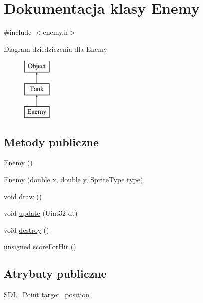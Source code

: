 \hypertarget{class_enemy}{}\section{Dokumentacja klasy Enemy}
\label{class_enemy}


{\ttfamily \#include $<$enemy.\+h$>$}

Diagram dziedziczenia dla Enemy\begin{figure}[H]
\begin{center}
\leavevmode
\includegraphics[height=3.000000cm]{class_enemy}
\end{center}
\end{figure}
\subsection*{Metody publiczne}
\begin{DoxyCompactItemize}
\item 
\hyperlink{class_enemy_a94f30d348b6d2840fd71675472ba38dd}{Enemy} ()
\item 
\hyperlink{class_enemy_a716fd77723d2c3c9a521672245bf89f8}{Enemy} (double x, double y, \hyperlink{type_8h_ac6fa10729dffeb6a192492f13c25e31a}{Sprite\+Type} \hyperlink{class_object_a1b89f32cd9e0040f8a2455f3cef7d0d2}{type})
\item 
void \hyperlink{class_enemy_a7dcf45915f6288ef9264ec60af621b6c}{draw} ()
\item 
void \hyperlink{class_enemy_a03c09cab6c4950e4cae880c15b2fd739}{update} (Uint32 dt)
\item 
void \hyperlink{class_enemy_a296a5757097f271eb01284eabb064715}{destroy} ()
\item 
unsigned \hyperlink{class_enemy_a024794c12555ca3b948aebb576e8915e}{score\+For\+Hit} ()
\end{DoxyCompactItemize}
\subsection*{Atrybuty publiczne}
\begin{DoxyCompactItemize}
\item 
S\+D\+L\+\_\+\+Point \hyperlink{class_enemy_abb410f03f34e4a1ce889ef8441382eb0}{target\+\_\+position}
\end{DoxyCompactItemize}
